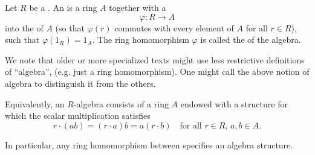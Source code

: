 \begin{definition} \label{definition:algebra_of_a_ring}
Let $R$ be a . An  is a ring $A$ together with a  
$$\varphi : R \to A$$ 
into the  of $A$ (so that $\varphi(r)$ commutes with every element of $A$ for all $r \in R$), such that $\varphi(1_R) = 1_A$. The ring homomorphism $\varphi$ is called the  of the algebra.

We note that older or more specialized texts might use less restrictive definitions of ``algebra'', (e.g. just a ring homomorphism). One might call the above notion of algebra  to distinguish it from the others.

Equivalently, an $R$-algebra consists of a ring $A$ endowed with a  structure for which the scalar multiplication satisfies
$$ r \cdot (ab) = (r \cdot a) b = a (r \cdot b) \quad \text{for all } r \in R, \, a,b \in A. $$

In particular, any ring homomorphism between  specifies an algebra structure.
\end{definition}
